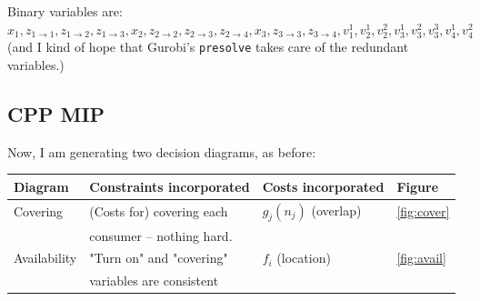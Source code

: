 \documentclass[11pt]{article}
\begin{document}
Binary variables are: \(x_{1}, z_{1\rightarrow 1}, z_{1\rightarrow 2},
z_{1\rightarrow 3}, x_{2}, z_{2\rightarrow 2}, z_{2\rightarrow 3},
z_{2\rightarrow 4}, x_{3}, z_{3\rightarrow 3}, z_{3\rightarrow 4}, v^1_1, v^1_2,
v^2_2, v^1_3, v^2_3, v^3_3, v^1_4, v^2_4\) (and I kind of hope that Gurobi's
\texttt{presolve} takes care of the redundant variables.)

\subsection{CPP MIP}
\label{sec:org0964bed}
Now, I am generating two decision diagrams, as before:

\begin{center}
\begin{tabular}{llll}
\textbf{Diagram} & \textbf{Constraints incorporated} & \textbf{Costs incorporated} & \textbf{Figure}\\
\hline
\hline
Covering & (Costs for) covering each & \(g_j(n_j)\) (overlap) & \ref{fig:cover}\\
 & consumer -- nothing hard. &  & \\
\hline
Availability & "Turn on" and "covering" & \(f_i\) (location) & \ref{fig:avail}\\
 & variables are consistent &  & \\
\hline
\end{tabular}
\end{center}
\end{document}
